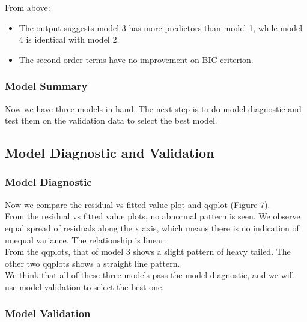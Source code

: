 \documentclass[12pt, letterpaper]{article}
\begin{document}
      From above:

      \begin{itemize}

        \item The output suggests model 3 has more predictors than model 1, while model 4 is identical with model 2.
        \item The second order terms have no improvement on BIC criterion.

      \end{itemize}

    \subsubsection{Model Summary}

      Now we have three models in hand. The next step is to do model diagnostic and test them on the validation data to select the best model.

  \subsection{Model Diagnostic and Validation}

    \subsubsection{Model Diagnostic}

      Now we compare the residual vs fitted value plot and qqplot (Figure 7).\\

      From the residual vs fitted value plots, no abnormal pattern is seen. We observe equal spread of residuals along the x axis, which means there is no indication of unequal variance. The relationship is linear.\\

      From the qqplots, that of model 3 shows a slight pattern of heavy tailed. The other two qqplots shows a straight line pattern.\\

      We think that all of these three models pass the model diagnostic, and we will use model validation to select the best one.\\

    \subsubsection{Model Validation}
\end{document}
